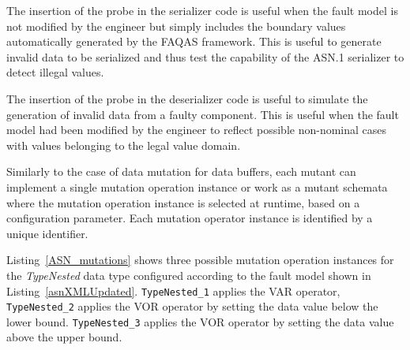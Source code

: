 The insertion of the probe in the serializer code is useful when the fault model is not modified by the engineer but simply includes the boundary values automatically generated by the FAQAS framework. 
This is useful to generate invalid data to be serialized and thus test the capability of the ASN.1 serializer to detect illegal values.

The insertion of the probe in the deserializer code is useful to simulate the generation of invalid data from a faulty component. This is useful when the fault model had been modified by the engineer to reflect possible non-nominal cases with values belonging to the legal value domain.


Similarly to the case of data mutation for data buffers, each mutant can implement a single mutation operation instance or work as a mutant schemata where the mutation operation instance is selected at runtime, based on a configuration parameter. Each mutation operator instance is identified by a unique identifier. 







Listing~\ref{ASN_mutations} shows three possible mutation operation instances for the \emph{TypeNested} data type configured according to the fault model shown in Listing~\ref{asnXMLUpdated}.
\texttt{TypeNested\_1} applies the VAR operator,
 \texttt{TypeNested\_2} applies the VOR operator by setting the data value below the lower bound.
 \texttt{TypeNested\_3} applies the VOR operator by setting the data value above the upper bound.



